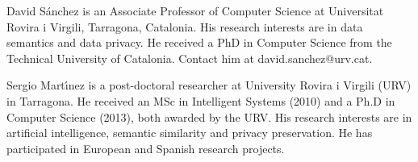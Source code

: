 \documentclass[10pt,journal,compsoc]{IEEEtran}
\theoremstyle{definition}
\theoremstyle{plain}
\begin{document}
\begin{IEEEbiography}{David S\'anchez}
is an Associate Professor of Computer Science at Universitat Rovira i Virgili, Tarragona,
Catalonia. His research interests are in data semantics and data privacy. He received a PhD in Computer
Science from the Technical University of Catalonia. Contact him at david.sanchez@urv.cat.
\end{IEEEbiography}

\begin{IEEEbiography}{Sergio Mart\'{\i}nez}
is a post-doctoral researcher at University Rovira i Virgili (URV) in Tarragona. He received an MSc in Intelligent Systems (2010) and a Ph.D in Computer 
Science (2013), both awarded by the URV. His research interests are 
in artificial intelligence, semantic similarity and privacy preservation. 
He has participated in European and Spanish research projects.
\end{IEEEbiography}








\vfill
\end{document}
